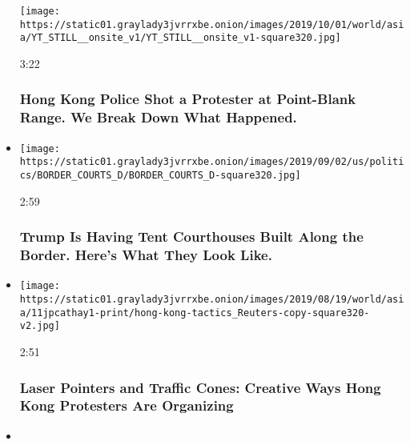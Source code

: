 \begin{itemize}
  \texttt{[image: https://static01.graylady3jvrrxbe.onion/images/2019/10/01/world/asia/YT\_STILL\_\_onsite\_v1/YT\_STILL\_\_onsite\_v1-square320.jpg]}

  3:22

  \hypertarget{hong-kong-police-shot-a-protester-at-point-blank-range-we-break-down-what-happened}{%
  \subsubsection{Hong Kong Police Shot a Protester at Point-Blank Range.
  We Break Down What
  Happened.}\label{hong-kong-police-shot-a-protester-at-point-blank-range-we-break-down-what-happened}}
\item
  \href{https://www.nytimes3xbfgragh.onion/video/us/politics/100000006681200/border-immigration-tent-courthouses.html?action=click\&module=video-series-bar\&region=header\&pgtype=Article\&playlistId=video/investigations}{}

  \texttt{[image: https://static01.graylady3jvrrxbe.onion/images/2019/09/02/us/politics/BORDER\_COURTS\_D/BORDER\_COURTS\_D-square320.jpg]}

  2:59

  \hypertarget{trump-is-having-tent-courthouses-built-along-the-border-heres-what-they-look-like}{%
  \subsubsection{Trump Is Having Tent Courthouses Built Along the
  Border. Here's What They Look
  Like.}\label{trump-is-having-tent-courthouses-built-along-the-border-heres-what-they-look-like}}
\item
  \href{https://www.nytimes3xbfgragh.onion/video/world/asia/100000006649109/laser-pointers-and-traffic-cones-creative-ways-hong-kong-protesters-are-organizing.html?action=click\&module=video-series-bar\&region=header\&pgtype=Article\&playlistId=video/investigations}{}

  \texttt{[image: https://static01.graylady3jvrrxbe.onion/images/2019/08/19/world/asia/11jpcathay1-print/hong-kong-tactics\_Reuters-copy-square320-v2.jpg]}

  2:51

  \hypertarget{laser-pointers-and-traffic-cones-creative-ways-hong-kong-protesters-are-organizing}{%
  \subsubsection{Laser Pointers and Traffic Cones: Creative Ways Hong
  Kong Protesters Are
  Organizing}\label{laser-pointers-and-traffic-cones-creative-ways-hong-kong-protesters-are-organizing}}
\item
  \href{https://www.nytimes3xbfgragh.onion/video/world/asia/100000006624535/hong-kong-protest-police-triad-investigation.html?action=click\&module=video-series-bar\&region=header\&pgtype=Article\&playlistId=video/investigations}{}


\end{itemize}
